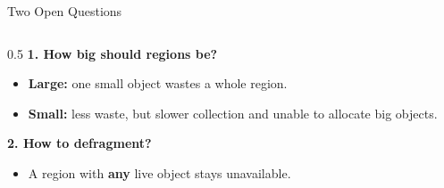 \documentclass[aspectratio=169]{beamer}
\begin{document}
\begin{frame}{Two Open Questions}
	\begin{columns}[c]
		\begin{column}{0.5\textwidth}
			\textbf{1. How big should regions be?}
			\begin{itemize}
				\item \textbf{Large:} one small object \alert{wastes} a whole region.
				\item \textbf{Small:} less waste, but \alert{slower collection} and unable to \alert{allocate big objects}.
			\end{itemize}

			\medskip
			\textbf{2. How to defragment?}
			\begin{itemize}
				\item A region with \textbf{any} live object stays unavailable.
			\end{itemize}
		\end{column}


\end{columns}
\end{frame}
\end{document}
